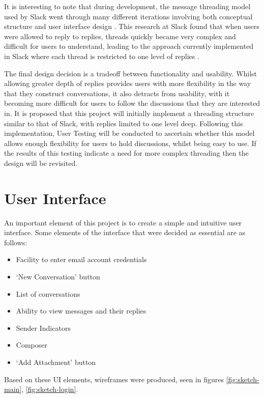 It is interesting to note that during development, the message threading model used by Slack went through many different iterations involving both conceptual structure and user interface design \cite{florin2018}. This research at Slack found that when users were allowed to reply to replies, threads quickly became very complex and difficult for users to understand, leading to the approach currently implemented in Slack where each thread is restricted to one level of replies \cite{florin2018}.

The final design decision is a tradeoff between functionality and usability. Whilst allowing greater depth of replies provides users with more flexibility in the way that they construct conversations, it also detracts from usability, with it becoming more difficult for users to follow the discussions that they are interested in. It is proposed that this project will initially implement a threading structure similar to that of Slack, with replies limited to one level deep. Following this implementation, User Testing will be conducted to ascertain whether this model allows enough flexibility for users to hold discussions, whilst being easy to use. If the results of this testing indicate a need for more complex threading then the design will be revisited.

\section{User Interface}

An important element of this project is to create a simple and intuitive user interface. Some elements of the interface that were decided as essential are as follows:
\begin{itemize}
  \item Facility to enter email account credentials
  \item `New Conversation' button
  \item List of conversations
  \item Ability to view messages and their replies
  \item Sender Indicators
  \item Composer
  \item `Add Attachment' button
\end{itemize}

Based on these UI elements, wireframes were produced, seen in figures \ref{fig:sketch-main}, \ref{fig:sketch-login}.

